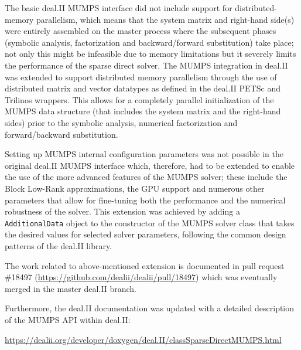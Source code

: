 \documentclass[a4paper,12pt]{article}
\begin{document}
The basic deal.II MUMPS interface did not include support for
distributed-memory parallelism, which means that the system matrix and
right-hand side(s) were entirely assembled on the master process where
the subsequent phases (symbolic analysis, factorization and
backward/forward substitution) take place; not only this might be
infeasible due to memory limitations but it severely limits the
performance of the sparse direct solver. The MUMPS integration in
deal.II was extended to support distributed memory parallelism through
the use of distributed matrix and vector datatypes as defined in the
deal.II PETSc and Trilinos wrappers. This allows for a completely
parallel initialization of the MUMPS data structure (that includes the
system matrix and the right-hand sides) prior to the symbolic
analysis, numerical factorization and forward/backward substitution.

Setting up MUMPS internal configuration parameters was not possible in
the original deal.II MUMPS interface which, therefore, had to be
extended to enable the use of the more advanced features of the MUMPS
solver; these include the Block Low-Rank approximations, the GPU
support and numerous other parameters that allow for fine-tuning both
the performance and the numerical robustness of the solver. This
extension was achieved by adding a \texttt{AdditionalData} object
to the constructor of the MUMPS solver class that takes the desired
values for selected solver parameters, following the common design
patterns of the deal.II library.

The work related to above-mentioned extension is documented in pull
request \#18497 (\url{https://github.com/dealii/dealii/pull/18497})
which was eventually merged in the master deal.II branch.

Furthermore, the deal.II documentation was updated with a detailed description
of the MUMPS API within deal.II:

\url{https://dealii.org/developer/doxygen/deal.II/classSparseDirectMUMPS.html}
\end{document}
